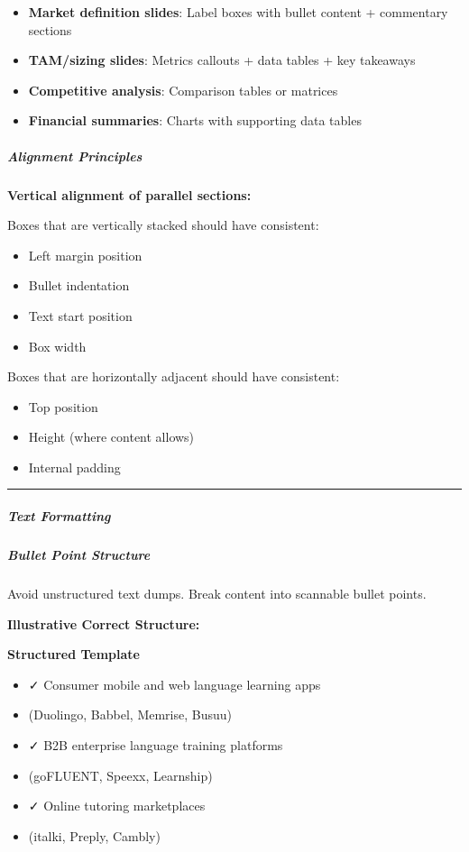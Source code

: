 \documentclass[11pt]{article}
\begin{document}
\begin{itemize}[leftmargin=*,itemsep=2pt,topsep=2pt]
\item {} \textbf{Market definition slides}: Label boxes with bullet content + commentary sections
\item {} \textbf{TAM/sizing slides}: Metrics callouts + data tables + key takeaways
\item {} \textbf{Competitive analysis}: Comparison tables or matrices
\item {} \textbf{Financial summaries}: Charts with supporting data tables
\end{itemize}

\subparagraph{Alignment Principles}\mbox{}\par

\textbf{Vertical alignment of parallel sections:}


Boxes that are vertically stacked should have consistent:

\begin{itemize}[leftmargin=*,itemsep=2pt,topsep=2pt]
\item {} Left margin position
\item {} Bullet indentation
\item {} Text start position
\item {} Box width
\end{itemize}

Boxes that are horizontally adjacent should have consistent:

\begin{itemize}[leftmargin=*,itemsep=2pt,topsep=2pt]
\item {} Top position
\item {} Height (where content allows)
\item {} Internal padding
\end{itemize}

\vspace{0.5em}\hrule\vspace{0.5em}

\subparagraph{Text Formatting}\mbox{}\par

\subparagraph{Bullet Point Structure}\mbox{}\par

Avoid unstructured text dumps. Break content into scannable bullet points.


\textbf{Illustrative Correct Structure:}

\textbf{Structured Template}
\begin{itemize}[leftmargin=*,itemsep=2pt,topsep=2pt]
\item {} ✓ Consumer mobile and web language learning apps
\item {} (Duolingo, Babbel, Memrise, Busuu)
\item {} ✓ B2B enterprise language training platforms
\item {} (goFLUENT, Speexx, Learnship)
\item {} ✓ Online tutoring marketplaces
\item {} (italki, Preply, Cambly)
\end{itemize}
\end{document}
